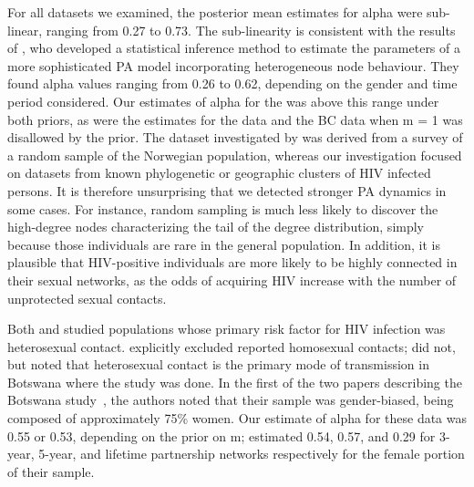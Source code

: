 For all datasets we examined, the posterior mean estimates for \gls{alpha} were
sub-linear, ranging from 
    0.27
to 
    0.73.
The sub-linearity is consistent with the results of
\textcite{de2007preferential}, who developed a statistical inference method to
estimate the parameters of a more sophisticated \acrlong{PA} model
incorporating heterogeneous node behaviour. They found \gls{alpha} values
ranging from 0.26 to 0.62, depending on the gender and time period considered. 
Our estimates of \gls{alpha} for the \textcite{niculescu2015recent} was above
this range under both priors, as were the estimates for the
\textcite{wang2015targeting} data and the BC data when \gls{m} = 1 was
disallowed by the prior. The dataset investigated by
\textcite{de2007preferential} was derived from a survey of a random sample of
the Norwegian population, whereas our investigation focused on datasets from
known phylogenetic or geographic clusters of \gls{HIV} infected persons. It is
therefore unsurprising that we detected stronger \acrlong{PA} dynamics in some
cases. For instance, random sampling is much less likely to discover the
high-degree nodes characterizing the tail of the degree distribution, simply
because those individuals are rare in the general population. In addition, it
is plausible that \gls{HIV}-positive individuals are more likely to be highly
connected in their sexual networks, as the odds of acquiring \gls{HIV} increase
with the number of unprotected sexual contacts.

Both \textcite{de2007preferential} and \textcite{novitsky2014impact} studied
populations whose primary risk factor for \gls{HIV} infection was heterosexual
contact. \citeauthor{de2007preferential} explicitly excluded reported
homosexual contacts; \citeauthor{novitsky2014impact} did not, but noted that
heterosexual contact is the primary mode of transmission in Botswana where the
study was done. In the first of the two papers describing the Botswana
study~\autocite{novitsky2013phylogenetic}, the authors noted that their sample
was gender-biased, being composed of approximately 75\% women. Our estimate of
\gls{alpha} for these data was 
    0.55
        or 
    0.53,
depending on the prior on \gls{m}; \citeauthor{de2007preferential} estimated
0.54, 0.57, and 0.29 for 3-year, 5-year, and lifetime partnership networks
respectively for the female portion of their sample.

